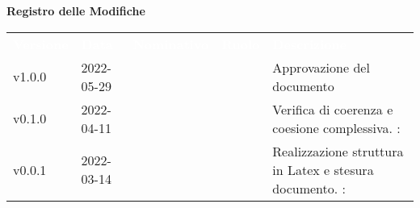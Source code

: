 

{\LARGE{\textbf{Registro delle Modifiche}}} \\
\begin{table}[!htbp]
	\renewcommand{\arraystretch}{1.5}
	\begin{tabular}{ m{}<{\centering}  m{}<{\centering}  m{}<{\centering}  m{}<{\centering}  m{}<{\centering} }
		\rowcolor{darkblue}
		\textcolor{white}{\textbf{Versione}} & \textcolor{white}{\textbf{Data}} & \textcolor{white}{\textbf{Nominativo}} & \textcolor{white}{\textbf{Ruolo}} & \textcolor{white}{\textbf{Descrizione}}                              \\
		v1.0.0                               & 2022-05-29                     & \MG                                       & \RE                               & Approvazione del documento                                           \\

		v0.1.0                               & 2022-04-11                       & \PV                                    & \AN                               & Verifica di coerenza e coesione complessiva. \VE: \textit{\GC}          \\

		v0.0.1                               & 2022-03-14                       & \PV                                    & \AN                               & Realizzazione struttura in Latex e stesura documento. \VE: \textit{\GC} \\
	\end{tabular}
\end{table}

\pagebreak
